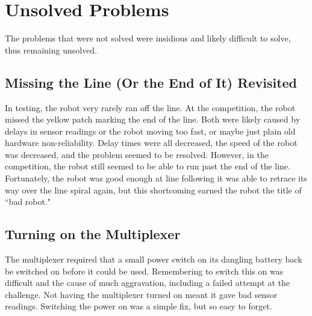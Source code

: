 \documentclass{article}
\begin{document}
\newpage
\section{Unsolved Problems}
The problems that were not solved were insidious and likely difficult to solve, thus remaining unsolved.

\subsection{Missing the Line (Or the End of It) Revisited}
In testing, the robot very rarely ran off the line. At the competition, the robot missed the yellow patch marking the end of the line. Both were likely caused by delays in sensor readings or the robot moving too fast, or maybe just plain old hardware non-reliability. Delay times were all decreased, the speed of the robot was decreased, and the problem seemed to be resolved. However, in the competition, the robot still seemed to be able to run past the end of the line. Fortunately, the robot was good enough at line following it was able to retrace its way over the line spiral again, but this shortcoming earned the robot the title of ``bad robot."

\subsection{Turning on the Multiplexer}
The multiplexer required that a small power switch on its dangling battery back be switched on before it could be used. Remembering to switch this on was difficult and the cause of much aggravation, including a failed attempt at the challenge. Not having the multiplexer turned on meant it gave bad sensor readings. Switching the power on was a simple fix, but so easy to forget.
\end{document}
